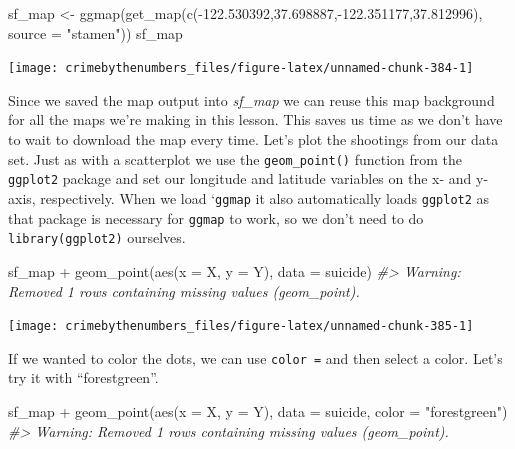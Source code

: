 \documentclass[
]{krantz}
\makeatletter
\newenvironment{Shaded}{\begin{snugshade}}{\end{snugshade}}
\newcommand{\AttributeTok}[1]{\textcolor[rgb]{0.61,0.61,0.61}{#1}}
\newcommand{\CommentTok}[1]{\textcolor[rgb]{0.37,0.37,0.37}{\textit{#1}}}
\newcommand{\FloatTok}[1]{\textcolor[rgb]{0.06,0.06,0.06}{#1}}
\newcommand{\FunctionTok}[1]{\textcolor[rgb]{0,0,0}{#1}}
\newcommand{\NormalTok}[1]{#1}
\newcommand{\OtherTok}[1]{\textcolor[rgb]{0.37,0.37,0.37}{#1}}
\newcommand{\SpecialCharTok}[1]{\textcolor[rgb]{0,0,0}{#1}}
\newcommand{\StringTok}[1]{\textcolor[rgb]{0.5,0.5,0.5}{#1}}
\newenvironment{kframe}{%
\medskip{}
\setlength{\fboxsep}{.8em}
 \def\at@end@of@kframe{}%
 \ifinner\ifhmode%
  \def\at@end@of@kframe{\end{minipage}}%
  \begin{minipage}{\columnwidth}%
 \fi\fi%
 \def\FrameCommand##1{\hskip\@totalleftmargin \hskip-\fboxsep
 \colorbox{shadecolor}{##1}\hskip-\fboxsep
     \hskip-\linewidth \hskip-\@totalleftmargin \hskip\columnwidth}%
 \MakeFramed {\advance\hsize-\width
   \@totalleftmargin\z@ \linewidth\hsize
   \@setminipage}}%
 {\par\unskip\endMakeFramed%
 \at@end@of@kframe}
\renewenvironment{Shaded}{\begin{kframe}}{\end{kframe}}
\makeatother
\begin{document}
\begin{Shaded}
\begin{Highlighting}[]
\NormalTok{sf\_map }\OtherTok{\textless{}{-}} \FunctionTok{ggmap}\NormalTok{(}\FunctionTok{get\_map}\NormalTok{(}\FunctionTok{c}\NormalTok{(}\SpecialCharTok{{-}}\FloatTok{122.530392}\NormalTok{,}\FloatTok{37.698887}\NormalTok{,}\SpecialCharTok{{-}}\FloatTok{122.351177}\NormalTok{,}\FloatTok{37.812996}\NormalTok{), }
                            \AttributeTok{source =} \StringTok{"stamen"}\NormalTok{))}
\NormalTok{sf\_map}
\end{Highlighting}
\end{Shaded}

\begin{center}\texttt{[image: crimebythenumbers\_files/figure-latex/unnamed-chunk-384-1]} \end{center}

Since we saved the map output into \emph{sf\_map} we can reuse this map background for all the maps we're making in this lesson. This saves us time as we don't have to wait to download the map every time. Let's plot the shootings from our data set. Just as with a scatterplot we use the \texttt{geom\_point()} function from the \texttt{ggplot2} package and set our longitude and latitude variables on the x- and y-axis, respectively. When we load `\texttt{ggmap} it also automatically loads \texttt{ggplot2} as that package is necessary for \texttt{ggmap} to work, so we don't need to do \texttt{library(ggplot2)} ourselves.

\begin{Shaded}
\begin{Highlighting}[]
\NormalTok{sf\_map }\SpecialCharTok{+}
  \FunctionTok{geom\_point}\NormalTok{(}\FunctionTok{aes}\NormalTok{(}\AttributeTok{x =}\NormalTok{ X, }\AttributeTok{y =}\NormalTok{ Y),}
             \AttributeTok{data  =}\NormalTok{ suicide)}
\CommentTok{\#\textgreater{} Warning: Removed 1 rows containing missing values (geom\_point).}
\end{Highlighting}
\end{Shaded}

\begin{center}\texttt{[image: crimebythenumbers\_files/figure-latex/unnamed-chunk-385-1]} \end{center}

If we wanted to color the dots, we can use \texttt{color\ =} and then select a color. Let's try it with ``forestgreen''.

\begin{Shaded}
\begin{Highlighting}[]
\NormalTok{sf\_map }\SpecialCharTok{+}
  \FunctionTok{geom\_point}\NormalTok{(}\FunctionTok{aes}\NormalTok{(}\AttributeTok{x =}\NormalTok{ X, }\AttributeTok{y =}\NormalTok{ Y),}
             \AttributeTok{data  =}\NormalTok{ suicide,}
             \AttributeTok{color =} \StringTok{"forestgreen"}\NormalTok{)}
\CommentTok{\#\textgreater{} Warning: Removed 1 rows containing missing values (geom\_point).}
\end{Highlighting}
\end{Shaded}
\end{document}
